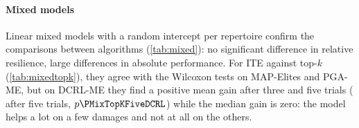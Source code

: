 \documentclass[11pt,a4paper]{article}
\newcommand{\ME}{MAP-Elites}
\newcommand{\PGA}{PGA-ME}
\newcommand{\DCRL}{DCRL-ME}
\begin{document}
\begin{table}[htbp]
\centering\small
\caption{Oracle re-evaluated on fresh episodes: mean bias of the 4-episode oracle, and medians of the resilience and
of the best gait after damage computed with the re-evaluated values.}
\label{tab:oraclecheck}

\end{table}

\paragraph{Mixed models} Linear mixed models with a random intercept per repertoire confirm the comparisons between
algorithms (\cref{tab:mixed}): no significant difference in relative resilience, large differences in absolute
performance. For ITE against top-$k$ (\cref{tab:mixedtopk}), they agree with the Wilcoxon tests on \ME{} and \PGA,
but on \DCRL{} they find a positive mean gain after three and five trials (\MixTopKFiveDCRL{} after five trials,
$p\PMixTopKFiveDCRL$) while the median gain is zero: the model helps a lot on a few damages and not at all on the
others.

\begin{table}[htbp]
\centering\small
\caption{Differences between algorithms from linear mixed models (fixed effects: algorithm and damage; random
intercept per repertoire), with 95\% confidence intervals.}
\label{tab:mixed}
\resizebox{\linewidth}{!}{}
\vspace{1em}
\caption{Mean gain of ITE over top-$k$ in $v$ (95\% confidence interval) from a mixed model per repertoire type.}
\label{tab:mixedtopk}

\end{table}
\end{document}
